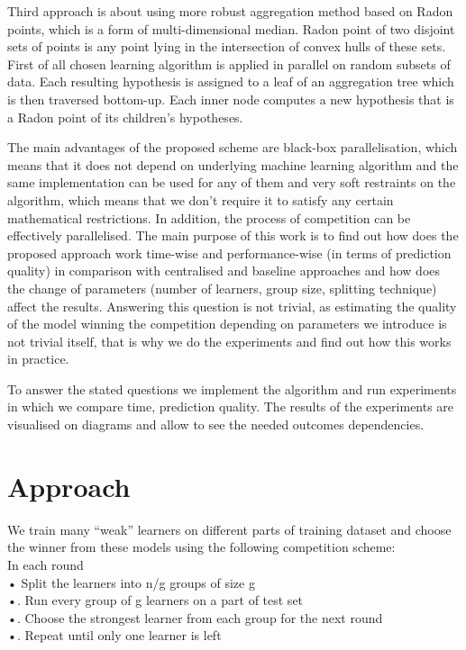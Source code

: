 \documentclass{scrartcl}
\begin{document}
Third approach is about using more robust aggregation method based on Radon points, which is a form of multi-dimensional median. Radon point of two disjoint sets of points is any point lying in the intersection of convex hulls of these sets. First of all chosen learning algorithm is applied in parallel on random subsets of data. Each resulting hypothesis is assigned to a leaf of an aggregation tree which is then traversed bottom-up. Each inner node computes a new hypothesis that is a Radon point of its children’s hypotheses.

The main advantages of the proposed scheme are black-box parallelisation, which means that it does not depend on underlying machine learning algorithm and the same implementation can be used for any of them and very soft restraints on the algorithm, which means that we don't require it to satisfy any certain mathematical restrictions. In addition, the process of competition can be effectively parallelised.
The main purpose of this work is to find out how does the proposed approach work time-wise and performance-wise (in terms of prediction quality) in comparison with centralised and baseline approaches and how does the change of parameters (number of learners, group size, splitting technique) affect the results. 
Answering this question is not trivial, as estimating the quality of the model winning the competition depending on parameters we introduce is not trivial itself, that is why we do the experiments and find out how this works in practice. 

To answer the stated questions we implement the algorithm and run experiments in which we compare time, prediction quality. The results of the experiments are visualised on diagrams and allow to see the needed outcomes dependencies.


\section{Approach}
We train many “weak” learners on different parts of training dataset and choose the winner from these models using the following competition scheme:\\
In each round\\
•   Split the learners into n/g groups of size g\\
•.  Run every group of g learners on a part of test set\\
•.  Choose the strongest learner from each group for the next round\\
•.  Repeat until only one learner is left\\
\end{document}
